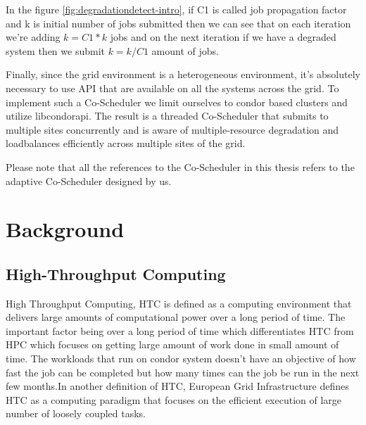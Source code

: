 \documentclass[ms,electronic,double]{nuthesis}
\begin{document}
In the figure \ref{fig:degradationdetect-intro}, if C1 is called job propagation factor and k is initial number of 
jobs submitted then we can see that on each iteration we're adding $k = C1 * k$ jobs and on the
next iteration if we have a degraded system then we submit $k=k/C1$ amount of 
jobs.

Finally, since the grid environment is a heterogeneous environment, it's absolutely necessary
to use API that are available on all the systems across the grid. To implement such a Co-Scheduler
 we limit ourselves to condor based clusters and utilize libcondorapi. The result is a threaded Co-Scheduler 
that submits to multiple sites concurrently and is aware of multiple-resource degradation and
loadbalances efficiently across multiple sites of the grid. 

Please note that all the references to the Co-Scheduler in this thesis refers to the adaptive Co-Scheduler designed 
by us.  

\chapter{Background}

\section{High-Throughput Computing} High Throughput Computing, HTC is defined as 
a computing environment that delivers large amounts of computational
power over a long period of time.  The important factor being over a long period of time which 
differentiates HTC from HPC which focuses on getting large amount of work done in small amount of time.
The workloads that run on condor system doesn't have an objective of  how fast the job can be completed 
but how many times can the job be run in the next few months.In another definition of HTC, European Grid  
Infrastructure defines HTC as a computing paradigm that focuses on the efficient 
execution of large number of loosely coupled tasks. \cite{manual56}
\end{document}

